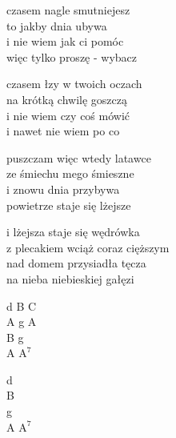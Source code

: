 \begin{text}
    czasem nagle smutniejesz\\
    to jakby dnia ubywa\\
    i nie wiem jak ci pomóc\\
    więc tylko proszę - wybacz

    czasem łzy w twoich oczach\\
    na krótką chwilę goszczą\\
    i nie wiem czy coś mówić\\
    i nawet nie wiem po co

    puszczam więc wtedy latawce\\
    ze śmiechu mego śmieszne\\
    i znowu dnia przybywa\\
    powietrze staje się lżejsze

    i lżejsza staje się wędrówka\\
    z plecakiem wciąż coraz cięższym\\
    nad domem przysiadła tęcza\\
    na nieba niebieskiej gałęzi
\end{text}
\begin{chord}
    d B C\\
    A g A\\
    B g\\
    A $\mathrm{A^{7}}$

    d\\
    B\\
    g\\
    A $\mathrm{A^{7}}$
\end{chord}
